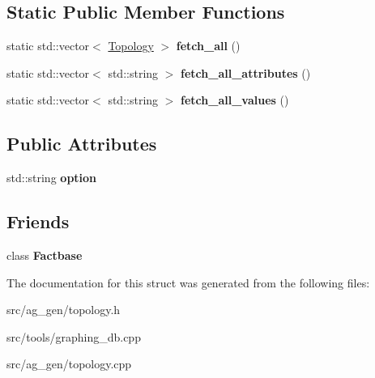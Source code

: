 \subsection*{Static Public Member Functions}
\begin{DoxyCompactItemize}
\item 
\mbox{\label{class_topology_a3f71c740d529d715f81f93ac0fff11c9}} 
static std\+::vector$<$ \mbox{\hyperlink{class_topology}{Topology}} $>$ {\bfseries fetch\+\_\+all} ()
\item 
\mbox{\label{class_topology_a4ef79a34c2756a64daf40024d0f14f8f}} 
static std\+::vector$<$ std\+::string $>$ {\bfseries fetch\+\_\+all\+\_\+attributes} ()
\item 
\mbox{\label{class_topology_ad726048461aaf6a1c15a7995d70a69ca}} 
static std\+::vector$<$ std\+::string $>$ {\bfseries fetch\+\_\+all\+\_\+values} ()
\end{DoxyCompactItemize}
\subsection*{Public Attributes}
\begin{DoxyCompactItemize}
\item 
\mbox{\label{class_topology_a82a3df76bc548b4c91325ad7cd3ced5d}} 
std\+::string {\bfseries option}
\end{DoxyCompactItemize}
\subsection*{Friends}
\begin{DoxyCompactItemize}
\item 
\mbox{\label{class_topology_af57acf978b262397fa5d12d64b884bde}} 
class {\bfseries Factbase}
\end{DoxyCompactItemize}


The documentation for this struct was generated from the following files\+:\begin{DoxyCompactItemize}
\item 
src/ag\+\_\+gen/topology.\+h\item 
src/tools/graphing\+\_\+db.\+cpp\item 
src/ag\+\_\+gen/topology.\+cpp\end{DoxyCompactItemize}
